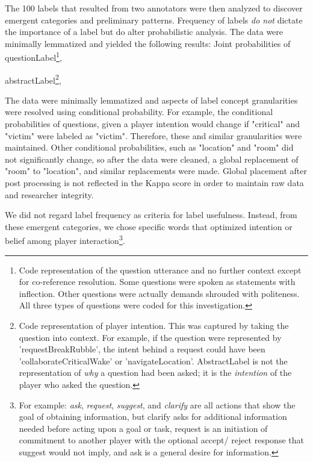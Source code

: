 \documentclass[10pt]{article}
\begin{document}
The 100 labels that resulted from two annotators were then analyzed to discover emergent categories and preliminary patterns. Frequency of labels \emph{do not} dictate the importance of a label but do alter probabilistic analysis. The data were minimally lemmatized and yielded the following results:
Joint probabilities of questionLabel\footnote{Code representation of the question utterance and no further context except for co-reference resolution. Some questions were spoken as statements with inflection. Other questions were actually demands shrouded with politeness. All three types of questions were coded for this investigation.}, 








abstractLabel\footnote{Code representation of player intention. This was captured by taking the question into context. For example, if the question were represented by 'requestBreakRubble', the intent behind a request could have been 'collaborateCriticalWake' or 'navigateLocation'. AbstractLabel is not the representation of \emph{why} a question had been asked; it is the \emph{intention} of the player who asked the question.}, 



The data were minimally lemmatized and aspects of label concept granularities were resolved using conditional probability. For example, the conditional probabilities of questions, given a player intention would change if "critical" and "victim" were labeled as "victim". Therefore, these and similar granularities were maintained. Other conditional probabilities, such as "location" and "room" did not significantly change, so after the data were cleaned, a global replacement of "room" to "location", and similar replacements were made. Global placement after post processing is not reflected in the Kappa score in order to maintain raw data and researcher integrity.

We did not regard label frequency as criteria for label usefulness. Instead, from these emergent categories, we chose specific words that optimized intention or belief among player interaction\footnote{For example: \emph{ask}, \emph{request}, \emph{suggest}, and \emph{clarify} are all actions that show the goal of obtaining information, but clarify asks for additional information needed before acting upon a goal or task, request is an initiation of commitment to another player with the optional accept/ reject response that suggest would not imply, and ask is a general desire for information.}. 
\end{document}
